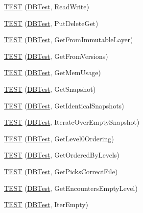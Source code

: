 \begin{DoxyCompactItemize}
\item 
\mbox{\hyperlink{namespaceleveldb_a2d427ecc9d7b712d8c5dd7ec8b6343fc}{T\+E\+ST}} (\mbox{\hyperlink{classleveldb_1_1_d_b_test}{D\+B\+Test}}, Read\+Write)
\item 
\mbox{\hyperlink{namespaceleveldb_a4d273f5f0d313440832363179e28e010}{T\+E\+ST}} (\mbox{\hyperlink{classleveldb_1_1_d_b_test}{D\+B\+Test}}, Put\+Delete\+Get)
\item 
\mbox{\hyperlink{namespaceleveldb_a21cac1755bd447df075909132bb964d4}{T\+E\+ST}} (\mbox{\hyperlink{classleveldb_1_1_d_b_test}{D\+B\+Test}}, Get\+From\+Immutable\+Layer)
\item 
\mbox{\hyperlink{namespaceleveldb_affd937ddc8c138fd0b5d020a396310c8}{T\+E\+ST}} (\mbox{\hyperlink{classleveldb_1_1_d_b_test}{D\+B\+Test}}, Get\+From\+Versions)
\item 
\mbox{\hyperlink{namespaceleveldb_a8d14b4d9f4b7e5f08dedf54020331143}{T\+E\+ST}} (\mbox{\hyperlink{classleveldb_1_1_d_b_test}{D\+B\+Test}}, Get\+Mem\+Usage)
\item 
\mbox{\hyperlink{namespaceleveldb_ad6fac95495278565df640d4055b9c9f0}{T\+E\+ST}} (\mbox{\hyperlink{classleveldb_1_1_d_b_test}{D\+B\+Test}}, Get\+Snapshot)
\item 
\mbox{\hyperlink{namespaceleveldb_a1fcf2cd69454b592660a99e2edd0916a}{T\+E\+ST}} (\mbox{\hyperlink{classleveldb_1_1_d_b_test}{D\+B\+Test}}, Get\+Identical\+Snapshots)
\item 
\mbox{\hyperlink{namespaceleveldb_a09603654ab44fba6026ef244b6f94b52}{T\+E\+ST}} (\mbox{\hyperlink{classleveldb_1_1_d_b_test}{D\+B\+Test}}, Iterate\+Over\+Empty\+Snapshot)
\item 
\mbox{\hyperlink{namespaceleveldb_a2b333e6a496f74899c808279627f11a0}{T\+E\+ST}} (\mbox{\hyperlink{classleveldb_1_1_d_b_test}{D\+B\+Test}}, Get\+Level0\+Ordering)
\item 
\mbox{\hyperlink{namespaceleveldb_a8f54952904ed501131060691eb1b6970}{T\+E\+ST}} (\mbox{\hyperlink{classleveldb_1_1_d_b_test}{D\+B\+Test}}, Get\+Ordered\+By\+Levels)
\item 
\mbox{\hyperlink{namespaceleveldb_ac3d2a0e1b8553c3106c45ead7d6804bb}{T\+E\+ST}} (\mbox{\hyperlink{classleveldb_1_1_d_b_test}{D\+B\+Test}}, Get\+Picks\+Correct\+File)
\item 
\mbox{\hyperlink{namespaceleveldb_a0cec95f588ef6c5c121ac0d63eb4238f}{T\+E\+ST}} (\mbox{\hyperlink{classleveldb_1_1_d_b_test}{D\+B\+Test}}, Get\+Encounters\+Empty\+Level)
\item 
\mbox{\hyperlink{namespaceleveldb_a5ad106e9bbfcb5520b7dc344525f7cd2}{T\+E\+ST}} (\mbox{\hyperlink{classleveldb_1_1_d_b_test}{D\+B\+Test}}, Iter\+Empty)

\end{DoxyCompactItemize}
